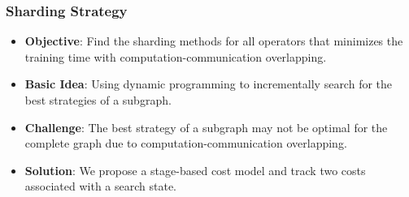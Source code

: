 \documentclass[12pt,aspectratio=169]{beamer}
\begin{document}
    \begin{frame}
        \frametitle{Sharding Strategy}

        \begin{itemize}
            \setlength{\itemsep}{.8em}
            \item \textbf{Objective}: Find the sharding methods for all operators that minimizes the training time with computation-communication overlapping.
            \item \textbf{Basic Idea}: Using dynamic programming to incrementally search for the best strategies of a subgraph.
            \item \textbf{Challenge}: The best strategy of a subgraph may not be optimal for the complete graph due to computation-communication overlapping.
            \item \textbf{Solution}: We propose a stage-based cost model and track two costs associated with a search state.
        \end{itemize}
    \end{frame}
\end{document}
